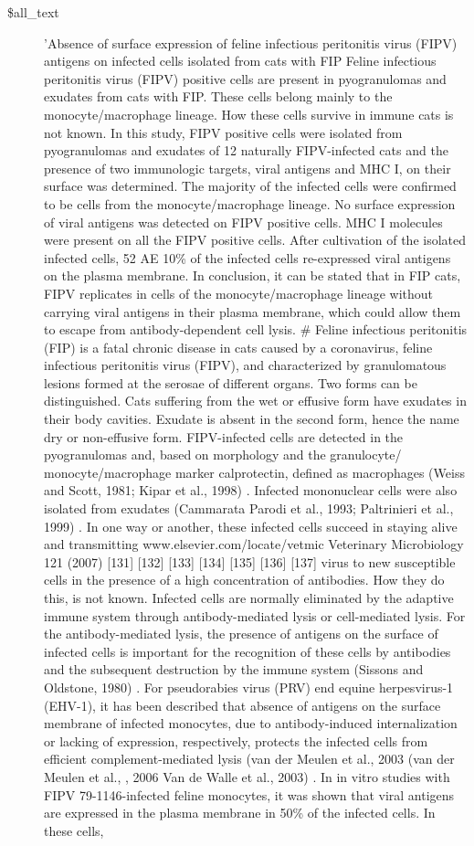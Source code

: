 \documentclass[11pt]{article}
\begin{document}
\begin{description}
\item[\$all\_text] 'Absence of surface expression of feline infectious peritonitis virus (FIPV) antigens on infected cells isolated from cats with FIP  Feline infectious peritonitis virus (FIPV) positive cells are present in pyogranulomas and exudates from cats with FIP. These cells belong mainly to the monocyte/macrophage lineage. How these cells survive in immune cats is not known. In this study, FIPV positive cells were isolated from pyogranulomas and exudates of 12 naturally FIPV-infected cats and the presence of two immunologic targets, viral antigens and MHC I, on their surface was determined. The majority of the infected cells were confirmed to be cells from the monocyte/macrophage lineage. No surface expression of viral antigens was detected on FIPV positive cells. MHC I molecules were present on all the FIPV positive cells. After cultivation of the isolated infected cells, 52 AE 10\% of the infected cells re-expressed viral antigens on the plasma membrane. In conclusion, it can be stated that in FIP cats, FIPV replicates in cells of the monocyte/macrophage lineage without carrying viral antigens in their plasma membrane, which could allow them to escape from antibody-dependent cell lysis. \#  Feline infectious peritonitis (FIP) is a fatal chronic disease in cats caused by a coronavirus, feline infectious peritonitis virus (FIPV), and characterized by granulomatous lesions formed at the serosae of different organs. Two forms can be distinguished. Cats suffering from the wet or effusive form have exudates in their body cavities. Exudate is absent in the second form, hence the name dry or non-effusive form. FIPV-infected cells are detected in the pyogranulomas and, based on morphology and the granulocyte/ monocyte/macrophage marker calprotectin, defined as macrophages (Weiss and Scott, 1981; Kipar et al., 1998) . Infected mononuclear cells were also isolated from exudates (Cammarata Parodi et al., 1993; Paltrinieri et al., 1999) . In one way or another, these infected cells succeed in staying alive and transmitting www.elsevier.com/locate/vetmic Veterinary Microbiology 121 (2007) {[}131{]} {[}132{]} {[}133{]} {[}134{]} {[}135{]} {[}136{]} {[}137{]} virus to new susceptible cells in the presence of a high concentration of antibodies. How they do this, is not known. Infected cells are normally eliminated by the adaptive immune system through antibody-mediated lysis or cell-mediated lysis. For the antibody-mediated lysis, the presence of antigens on the surface of infected cells is important for the recognition of these cells by antibodies and the subsequent destruction by the immune system (Sissons and Oldstone, 1980) . For pseudorabies virus (PRV) end equine herpesvirus-1 (EHV-1), it has been described that absence of antigens on the surface membrane of infected monocytes, due to antibody-induced internalization or lacking of expression, respectively, protects the infected cells from efficient complement-mediated lysis (van der Meulen et al., 2003 (van der Meulen et al., , 2006 Van de Walle et al., 2003) . In in vitro studies with FIPV 79-1146-infected feline monocytes, it was shown that viral antigens are expressed in the plasma membrane in 50\% of the infected cells. In these cells, 
\end{description}
\end{document}
